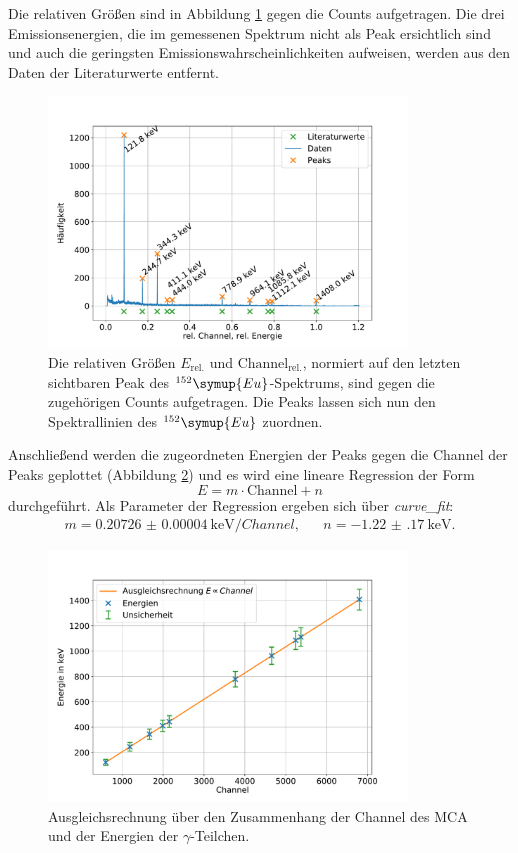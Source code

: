 Die relativen Größen sind in Abbildung \ref{fig:eu_kalibration} gegen die Counts aufgetragen.
Die drei Emissionsenergien, die im gemessenen Spektrum nicht als Peak ersichtlich sind und auch die geringsten Emissionswahrscheinlichkeiten aufweisen, werden aus den Daten der Literaturwerte entfernt.
\begin{figure}[h!]
  \centering
  \includegraphics[width=0.85\textwidth]{content/images/spektrum_europium_kali.pdf}
  \caption{Die relativen Größen $E_{\text{rel.}}$ und $\text{Channel}_{\text{rel.}}$, normiert auf den letzten sichtbaren Peak des $^{152}\symup{Eu}$-Spektrums, sind gegen die zugehörigen Counts aufgetragen.
  Die Peaks lassen sich nun den Spektrallinien des $^{152}\symup{Eu}$ zuordnen.}
  \label{fig:eu_kalibration}
\end{figure}
Anschließend werden die zugeordneten Energien der Peaks gegen die Channel der Peaks geplottet (Abbildung \ref{fig:kalibration}) und es wird eine lineare Regression der Form
\begin{equation}
	E = m \cdot \text{Channel} + n
\end{equation}
durchgeführt.
Als Parameter der Regression ergeben sich über \textit{curve\_fit}:
\begin{align*}
	m = \SI{0.20726(4)}{\kilo \electronvolt \per Channel}, && n = \SI{-1.22(17)}{\kilo \electronvolt}.
\end{align*}
\begin{figure}[h!]
  \centering
  \includegraphics[width=0.85\textwidth]{content/images/kalibration.pdf}
  \caption{Ausgleichsrechnung über den Zusammenhang der Channel des MCA und der Energien der $\gamma$-Teilchen.}
  \label{fig:kalibration}
\end{figure}
\FloatBarrier


